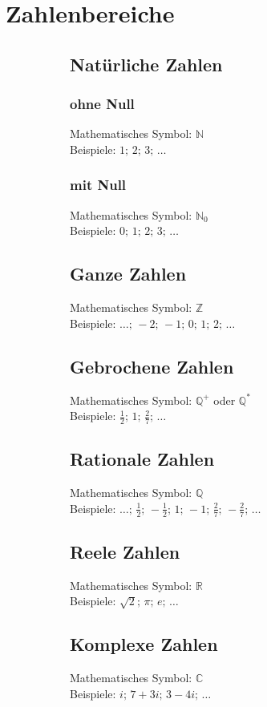 \documentclass[11pt,a4paper,oneside]{article}
\begin{document}
\section{Zahlenbereiche}
\begin{figure}[h]
	\begin{subfigure}[t]{0.5\linewidth}
\subsection{Natürliche Zahlen}
\subsubsection*{ohne Null}
Mathematisches Symbol: $\mathbb{N}$
\\
Beispiele: $1;\,2;\,3;\,\ldots$
\subsubsection*{mit Null}
Mathematisches Symbol: $\mathbb{N}_{0}$
\\
Beispiele: $0;\,1;\,2;\,3;\,\ldots$
\subsection{Ganze Zahlen}
Mathematisches Symbol: $\mathbb{Z}$
\\
Beispiele: $\ldots;\,-2;\,-1;\,0;\,1;\,2;\,\ldots$
\subsection{Gebrochene Zahlen}
Mathematisches Symbol: $\mathbb{Q}^{+}$ oder $\mathbb{Q}^{*}$
\\
Beispiele: $\frac{1}{2};\,1;\,\frac{2}{7};\,\ldots$

	\end{subfigure}%
	\begin{subfigure}[t]{0.5\linewidth}
\subsection{Rationale Zahlen}
Mathematisches Symbol: $\mathbb{Q}$
\\
Beispiele: $\ldots;\,\frac{1}{2};\,-\frac{1}{2};\,1;\,-1;\,\frac{2}{7};\,-\frac{2}{7};\,\ldots$
\subsection{Reele Zahlen}
Mathematisches Symbol: $\mathbb{R}$
\\
Beispiele: $\sqrt{2};\,\pi;\,e;\,\ldots$
\subsection{Komplexe Zahlen}
Mathematisches Symbol: $\mathbb{C}$
\\
Beispiele: $i;\,7+3i;\,3-4i;\,\ldots$
	\end{subfigure}
\end{figure}
\vspace{-1em}
\end{document}
